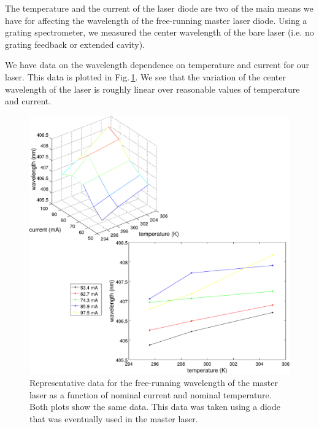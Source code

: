 The temperature and the current of the laser diode are two of the main means we have for affecting the wavelength of the free-running master laser diode. Using a grating spectrometer, we measured the center wavelength of the bare laser (i.e. no grating feedback or extended cavity).


We have data on the wavelength dependence on temperature and current for our laser. This data is plotted in Fig.\,\ref{3dCurrentandTgraph}. We see that the variation of the center wavelength of the laser is roughly linear over reasonable values of temperature and current.



\begin{figure}
\includegraphics[width=.95\textwidth]{TVlambda4.eps} 
\caption[Wavelength vs temperature and current]{\label{3dCurrentandTgraph} Representative data for the free-running wavelength of the master laser as a function of nominal current and nominal temperature. Both plots show the same data. This data was taken using a diode that was eventually used in the master laser.}
\end{figure}

